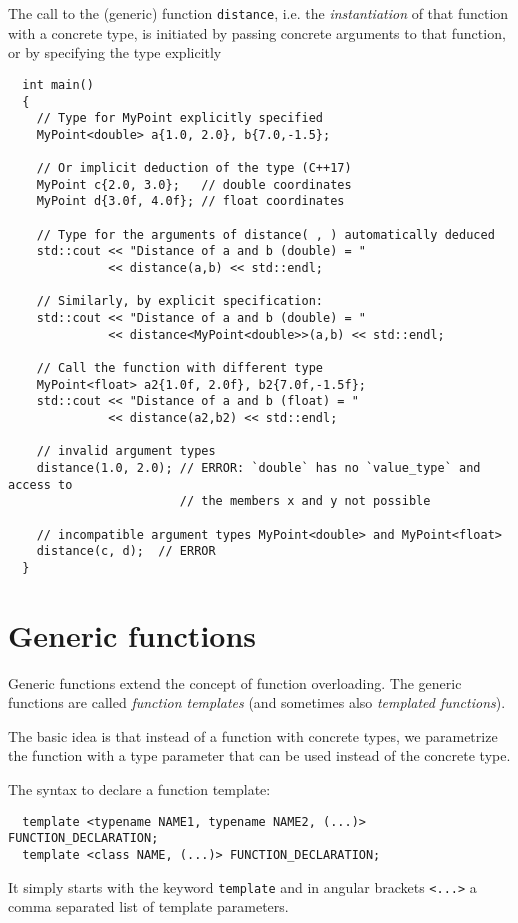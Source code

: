 The call to the (generic) function \texttt{distance}, i.e. the \emph{instantiation} of that function with a concrete type, is
initiated by passing concrete arguments to that function, or by specifying the type explicitly
\begin{verbatim}
  int main()
  {
    // Type for MyPoint explicitly specified
    MyPoint<double> a{1.0, 2.0}, b{7.0,-1.5};

    // Or implicit deduction of the type (C++17)
    MyPoint c{2.0, 3.0};   // double coordinates
    MyPoint d{3.0f, 4.0f}; // float coordinates

    // Type for the arguments of distance( , ) automatically deduced
    std::cout << "Distance of a and b (double) = "
              << distance(a,b) << std::endl;

    // Similarly, by explicit specification:
    std::cout << "Distance of a and b (double) = "
              << distance<MyPoint<double>>(a,b) << std::endl;

    // Call the function with different type
    MyPoint<float> a2{1.0f, 2.0f}, b2{7.0f,-1.5f};
    std::cout << "Distance of a and b (float) = "
              << distance(a2,b2) << std::endl;

    // invalid argument types
    distance(1.0, 2.0); // ERROR: `double` has no `value_type` and access to
                        // the members x and y not possible

    // incompatible argument types MyPoint<double> and MyPoint<float>
    distance(c, d);  // ERROR
  }
\end{verbatim}


\section{Generic functions}
Generic functions extend the concept of function overloading. The generic functions are called \emph{function templates} (and sometimes also
\emph{templated functions}).

The basic idea is that instead of a function with concrete types, we parametrize the function with a type parameter that can be used
instead of the concrete type.

The syntax to declare a function template:
\begin{verbatim}
  template <typename NAME1, typename NAME2, (...)> FUNCTION_DECLARATION;
  template <class NAME, (...)> FUNCTION_DECLARATION;
\end{verbatim}
It simply starts with the keyword \texttt{template} and in angular brackets \texttt{<...>} a comma separated list of template parameters.

